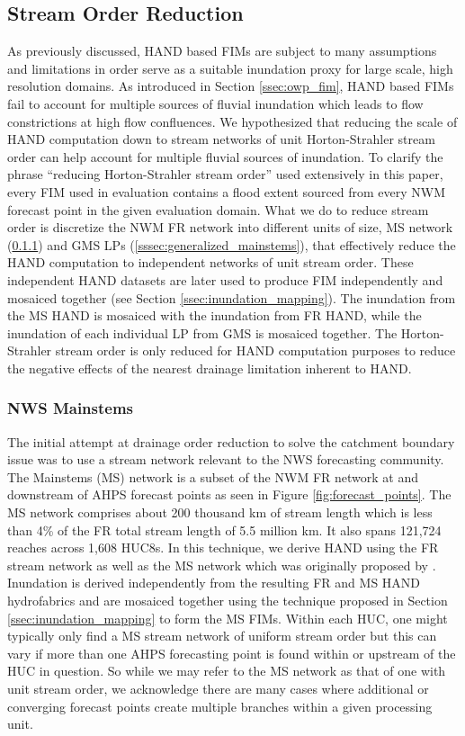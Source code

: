 \subsection{Stream Order Reduction}
\label{ssec:stream_order_reduction}
%
As previously discussed, HAND based FIMs are subject to many assumptions and limitations in order serve as a suitable inundation proxy for large scale, high resolution domains.
As introduced in Section \ref{ssec:owp_fim}, HAND based FIMs fail to account for multiple sources of fluvial inundation which leads to flow constrictions at high flow confluences.
We hypothesized that reducing the scale of HAND computation down to stream networks of unit Horton-Strahler stream order can help account for multiple fluvial sources of inundation.
To clarify the phrase ``reducing Horton-Strahler stream order'' used extensively in this paper, every FIM used in evaluation contains a flood extent sourced from every NWM forecast point in the given evaluation domain.
What we do to reduce stream order is discretize the NWM FR network into different units of size, MS network (\ref{sssec:nws_mainstems}) and GMS LPs (\ref{sssec:generalized_mainstems}), that effectively reduce the HAND computation to independent networks of unit stream order.
These independent HAND datasets are later used to produce FIM independently and mosaiced together (see Section \ref{ssec:inundation_mapping}).
The inundation from the MS HAND is mosaiced with the inundation from FR HAND, while the inundation of each individual LP from GMS is mosaiced together.
The Horton-Strahler stream order is only reduced for HAND computation purposes to reduce the negative effects of the nearest drainage limitation inherent to HAND.
%
\subsubsection{NWS Mainstems}
\label{sssec:nws_mainstems}
%
The initial attempt at drainage order reduction to solve the catchment boundary issue was to use a stream network relevant to the NWS forecasting community. 
The Mainstems (MS) network is a subset of the NWM FR network at and downstream of AHPS forecast points as seen in Figure \ref{fig:forecast_points}.
The MS network comprises about 200 thousand km of stream length which is less than 4\% of the FR total stream length of 5.5 million km.
It also spans 121,724 reaches across 1,608 HUC8s.
In this technique, we derive HAND using the FR stream network as well as the MS network which was originally proposed by .
Inundation is derived independently from the resulting FR and MS HAND hydrofabrics and are mosaiced together using the technique proposed in Section \ref{ssec:inundation_mapping} to form the MS FIMs. 
Within each HUC, one might typically only find a MS stream network of uniform stream order but this can vary if more than one AHPS forecasting point is found within or upstream of the HUC in question.
So while we may refer to the MS network as that of one with unit stream order, we acknowledge there are many cases where additional or converging forecast points create multiple branches within a given processing unit.
%
